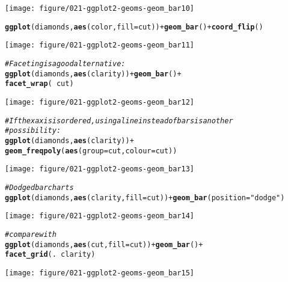 \documentclass[a4paper,titlepage]{tufte-handout}\usepackage[]{graphicx}\usepackage[]{color}
\makeatletter
\def\maxwidth{ %
  \ifdim\Gin@nat@width>\linewidth
    \linewidth
  \else
    \Gin@nat@width
  \fi
}
\newcommand{\hlstr}[1]{\textcolor[rgb]{0.192,0.494,0.8}{#1}}%
\newcommand{\hlcom}[1]{\textcolor[rgb]{0.678,0.584,0.686}{\textit{#1}}}%
\newcommand{\hlopt}[1]{\textcolor[rgb]{0,0,0}{#1}}%
\newcommand{\hlstd}[1]{\textcolor[rgb]{0.345,0.345,0.345}{#1}}%
\newcommand{\hlkwc}[1]{\textcolor[rgb]{0.333,0.667,0.333}{#1}}%
\newcommand{\hlkwd}[1]{\textcolor[rgb]{0.737,0.353,0.396}{\textbf{#1}}}%
\newenvironment{kframe}{%
 \def\at@end@of@kframe{}%
 \ifinner\ifhmode%
  \def\at@end@of@kframe{\end{minipage}}%
  \begin{minipage}{\columnwidth}%
 \fi\fi%
 \def\FrameCommand##1{\hskip\@totalleftmargin \hskip-\fboxsep
 \colorbox{shadecolor}{##1}\hskip-\fboxsep
     \hskip-\linewidth \hskip-\@totalleftmargin \hskip\columnwidth}%
 \MakeFramed {\advance\hsize-\width
   \@totalleftmargin\z@ \linewidth\hsize
   \@setminipage}}%
 {\par\unskip\endMakeFramed%
 \at@end@of@kframe}
\newenvironment{knitrout}{}{} %
\makeatother
\begin{document}
\begin{knitrout}
\begin{kframe}
\begin{alltt}
\end{alltt}
\end{kframe}
\texttt{[image: figure/021-ggplot2-geoms-geom\_bar10]} 
\begin{kframe}\begin{alltt}
\hlkwd{ggplot}\hlstd{(diamonds,} \hlkwd{aes}\hlstd{(color,} \hlkwc{fill}\hlstd{=cut))} \hlopt{+} \hlkwd{geom_bar}\hlstd{()} \hlopt{+} \hlkwd{coord_flip}\hlstd{()}
\end{alltt}
\end{kframe}
\texttt{[image: figure/021-ggplot2-geoms-geom\_bar11]} 
\begin{kframe}\begin{alltt}
\hlcom{# Faceting is a good alternative:}
\hlkwd{ggplot}\hlstd{(diamonds,} \hlkwd{aes}\hlstd{(clarity))} \hlopt{+} \hlkwd{geom_bar}\hlstd{()} \hlopt{+}
  \hlkwd{facet_wrap}\hlstd{(}\hlopt{~} \hlstd{cut)}
\end{alltt}
\end{kframe}
\texttt{[image: figure/021-ggplot2-geoms-geom\_bar12]} 
\begin{kframe}\begin{alltt}
\hlcom{# If the x axis is ordered, using a line instead of bars is another}
\hlcom{# possibility:}
\hlkwd{ggplot}\hlstd{(diamonds,} \hlkwd{aes}\hlstd{(clarity))} \hlopt{+}
  \hlkwd{geom_freqpoly}\hlstd{(}\hlkwd{aes}\hlstd{(}\hlkwc{group} \hlstd{= cut,} \hlkwc{colour} \hlstd{= cut))}
\end{alltt}
\end{kframe}
\texttt{[image: figure/021-ggplot2-geoms-geom\_bar13]} 
\begin{kframe}\begin{alltt}
\hlcom{# Dodged bar charts}
\hlkwd{ggplot}\hlstd{(diamonds,} \hlkwd{aes}\hlstd{(clarity,} \hlkwc{fill}\hlstd{=cut))} \hlopt{+} \hlkwd{geom_bar}\hlstd{(}\hlkwc{position}\hlstd{=}\hlstr{"dodge"}\hlstd{)}
\end{alltt}
\end{kframe}
\texttt{[image: figure/021-ggplot2-geoms-geom\_bar14]} 
\begin{kframe}\begin{alltt}
\hlcom{# compare with}
\hlkwd{ggplot}\hlstd{(diamonds,} \hlkwd{aes}\hlstd{(cut,} \hlkwc{fill}\hlstd{=cut))} \hlopt{+} \hlkwd{geom_bar}\hlstd{()} \hlopt{+}
  \hlkwd{facet_grid}\hlstd{(.} \hlopt{~} \hlstd{clarity)}
\end{alltt}
\end{kframe}
\texttt{[image: figure/021-ggplot2-geoms-geom\_bar15]} 

\end{knitrout}
\end{document}

